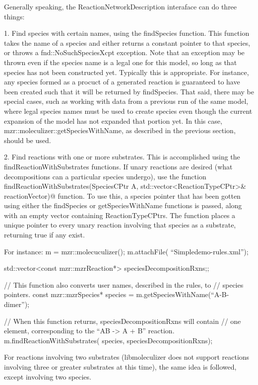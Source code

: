 Generally speaking, the ReactionNetworkDescription interaface can do
three things:

1.
Find species with certain names, using the findSpecies function.  This
function takes the name of a species and either returns a constant
pointer to that species, or throws a fnd::NoSuchSpeciesXcpt
exception.  Note that an exception may be thrown even if the species
name is a legal one for this model, so long as that species has not
been constructed yet.  Typically this is appropriate.  For instance,
any species formed as a procuct of a generated reaction is guaranteed
to have been created such that it will be returned by findSpecies.
That said, there may be special cases, such as working with data from
a previous run of the same model, where legal species names must be
used to create species even though the current expansion of the model
has not expanded that portion yet.  In this case,
mzr::moleculizer::getSpeciesWithName, as described in the previous
section, should be used.  

2.  Find reactions with one or more substrates.
This is accomplished using the findReactionWithSubstrates functions.
If unary reactions are desired (what decompositions can a particular
species undergo), use the function 
\lstinline@bool findReactionWithSubstrates(SpeciesCPtr A, std::vector<ReactionTypeCPtr>& reactionVector)@ function.  To use 
this, a species pointer that has been gotten using either the
findSpecies or getSpeciesWithName functions is passed, along with an
empty vector containing ReactionTypeCPtrs.  The function places a
unique pointer to every unary reaction involving that species as a
substrate, returning true if any exist.  

For instance:
m = mzr::molecuculizer();
m.attachFile( ``Simpledemo-rules.xml''); 

std::vector<const mzr::mzrReaction*> speciesDecompositionRxns;;

// This function also converts user names, described in the rules, to
// species pointers.
const mzr::mzrSpecies* species = m.getSpeciesWithName(``A-B-dimer'');

// When this function returns, speciesDecompositionRxns will contain
// one element, corresponding to the ``AB -> A + B'' reaction.  
m.findReactionWithSubstrates( species, speciesDecompositionRxns);

For reactions involving two substrates (libmoleculizer does not
support reactions involving three or greater substrates at this time),
the same idea is followed, except involving two species.  

